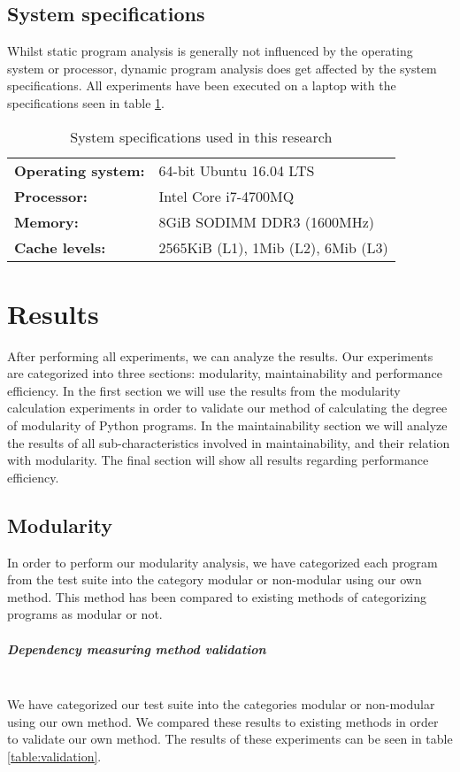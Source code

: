 \documentclass[twoside]{uva-inf-bachelor-thesis}
\newcommand{\myparagraph}[1]{\paragraph{#1}\mbox{}\\}
\begin{document}
\section{System specifications}
Whilst static program analysis is generally not influenced by the operating system or processor, dynamic program analysis does get affected by the system specifications. All experiments have been executed on a laptop with the specifications seen in table \ref{table:specifications}.
\begin{table}[H]
\centering
\caption{System specifications used in this research}
\label{table:specifications}
\begin{tabular}{ll}
\textbf{Operating system:} & 64-bit Ubuntu 16.04 LTS    \\
\textbf{Processor:}        & Intel Core i7-4700MQ       \\
\textbf{Memory:}           & 8GiB SODIMM DDR3 (1600MHz) \\
\textbf{Cache levels:}     & 2565KiB (L1), 1Mib (L2), 6Mib (L3) \\
\end{tabular}
\end{table}

\chapter{Results}
\label{chapter:results}
After performing all experiments, we can analyze the results. Our experiments are categorized into three sections: modularity, maintainability and performance efficiency. In the first section we will use the results from the modularity calculation experiments in order to validate our method of calculating the degree of modularity of Python programs. In the maintainability section we will analyze the results of all sub-characteristics involved in maintainability, and their relation with modularity. The final section will show all results regarding performance efficiency.

\section{Modularity}
In order to perform our modularity analysis, we have categorized each program from the test suite into the category modular or non-modular using our own method. This method has been compared to existing methods of categorizing programs as modular or not.

\myparagraph{Dependency measuring method validation}
We have categorized our test suite into the categories modular or non-modular using our own method. We compared these results to existing methods in order to validate our own method. The results of these experiments can be seen in table \ref{table:validation}.
\end{document}
